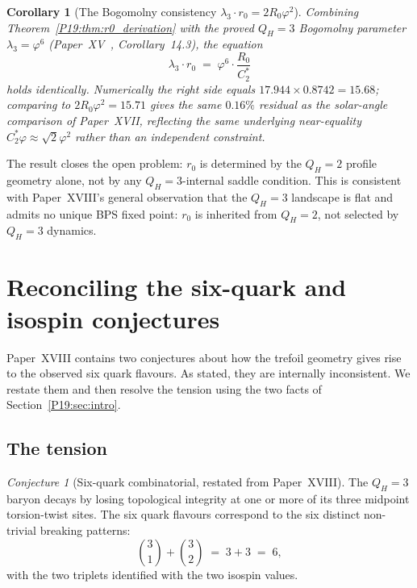 \documentclass[11pt,a4paper]{article}
\newtheorem{corollary}[theorem]{Corollary}
\theoremstyle{definition}\newtheorem{definition}[theorem]{Definition}
\theoremstyle{remark}
\newtheorem{conjecture}[theorem]{Conjecture}
\newcommand{\vp}{\varphi}
\newcommand{\QH}{Q_H}
\begin{document}
\begin{corollary}[The Bogomolny consistency $\lambda_3\cdot r_0=2R_0\vp^2$]
\label{P19:cor:lambda3_consistency}
Combining Theorem~\ref{P19:thm:r0_derivation} with the proved
$\QH=3$ Bogomolny parameter $\lambda_3=\vp^6$
(Paper~XV~\cite{Paper15}, Corollary~14.3), the equation %
\begin{equation}
  \lambda_3\cdot r_0 \;=\; \vp^6\cdot\frac{R_0}{C_2^*}
  \label{P19:eq:lambda3_consistency}
\end{equation}
holds identically.  Numerically the right side equals
$17.944\times 0.8742=15.68$; comparing to $2R_0\vp^2=15.71$
gives the same $0.16\%$ residual as the solar-angle comparison of
Paper~XVII, reflecting the same underlying near-equality
$C_2^*\vp\approx\sqrt{2}\vp^2$ rather than an independent constraint.
\end{corollary}

The result closes the open problem: $r_0$ is determined by the
$\QH=2$ profile geometry alone, not by any $\QH=3$-internal
saddle condition.  This is consistent with Paper~XVIII's general
observation that the $\QH=3$ landscape is flat and admits no unique
BPS fixed point: $r_0$ is inherited from $\QH=2$, not selected by
$\QH=3$ dynamics.

\section{Reconciling the six-quark and isospin conjectures}
\label{P19:sec:reconciliation}

Paper~XVIII contains two conjectures about how the trefoil geometry
gives rise to the observed six quark flavours.  As stated, they are
internally inconsistent.  We restate them and then resolve the
tension using the two facts of Section~\ref{P19:sec:intro}.

\subsection{The tension}

\begin{conjecture}[Six-quark combinatorial, restated from Paper~XVIII]
\label{P19:conj:six_quarks_r19}
The $\QH=3$ baryon decays by losing topological integrity at one or
more of its three midpoint torsion-twist sites.  The six quark
flavours correspond to the six distinct non-trivial breaking
patterns:
\begin{equation}
  \binom{3}{1}+\binom{3}{2} \;=\; 3+3 \;=\; 6,
  \label{P19:eq:sixquark_count_r19}
\end{equation}
with the two triplets identified with the two isospin values.
\end{conjecture}
\end{document}
